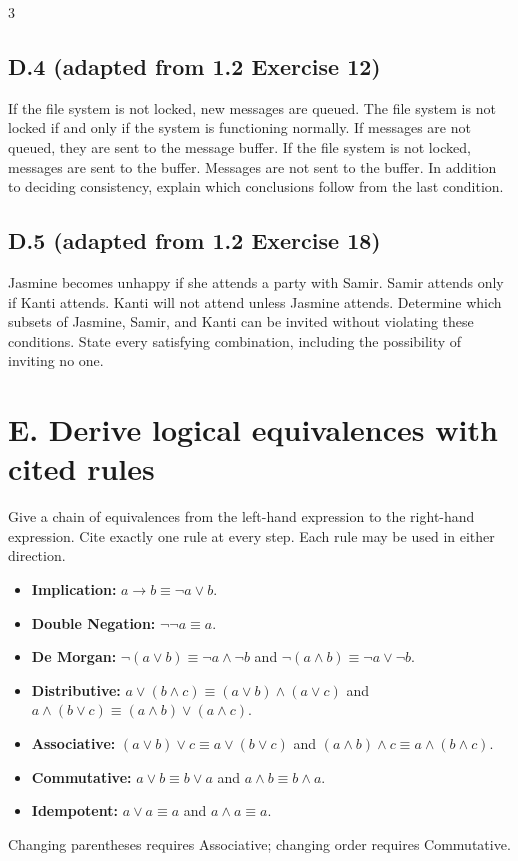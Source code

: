 \documentclass{article}
\newcommand{\problem}[2]{%
  \par
  \subsection*{#1 {\normalfont\footnotesize (#2)}}%
}
\begin{document}
\begin{multicols}{3}
\problem{D.4}{adapted from 1.2 Exercise 12}
If the file system is not locked, new messages are queued. The file system is
not locked if and only if the system is functioning normally. If messages are
not queued, they are sent to the message buffer. If the file system is not
locked, messages are sent to the buffer. Messages are not sent to the buffer.
In addition to deciding consistency, explain which conclusions follow from the
last condition.

\problem{D.5}{adapted from 1.2 Exercise 18}
Jasmine becomes unhappy if she attends a party with Samir. Samir attends only
if Kanti attends. Kanti will not attend unless Jasmine attends. Determine which
subsets of Jasmine, Samir, and Kanti can be invited without violating these
conditions. State every satisfying combination, including the possibility of
inviting no one.
\section*{E. Derive logical equivalences with cited rules}

\begin{tcolorbox}[title=Permitted rules for E.1--E.5]
Give a chain of equivalences from the left-hand expression to the right-hand
expression. Cite exactly one rule at every step. Each rule may be used in either
direction.
\begin{itemize}
  \item \textbf{Implication:} $a\to b\equiv\neg a\lor b$.
  \item \textbf{Double Negation:} $\neg\neg a\equiv a$.
  \item \textbf{De Morgan:}
        $\neg(a\lor b)\equiv\neg a\land\neg b$ and
        $\neg(a\land b)\equiv\neg a\lor\neg b$.
  \item \textbf{Distributive:}
        $a\lor(b\land c)\equiv(a\lor b)\land(a\lor c)$ and
        $a\land(b\lor c)\equiv(a\land b)\lor(a\land c)$.
  \item \textbf{Associative:}
        $(a\lor b)\lor c\equiv a\lor(b\lor c)$ and
        $(a\land b)\land c\equiv a\land(b\land c)$.
  \item \textbf{Commutative:}
        $a\lor b\equiv b\lor a$ and $a\land b\equiv b\land a$.
  \item \textbf{Idempotent:}
        $a\lor a\equiv a$ and $a\land a\equiv a$.
\end{itemize}
Changing parentheses requires Associative; changing order requires
Commutative.
\end{tcolorbox}


\end{multicols}
\end{document}
